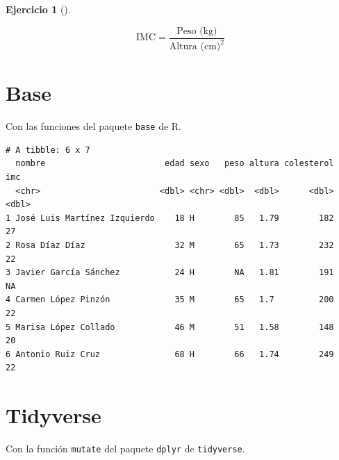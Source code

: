 \documentclass[
  a4paper,
]{scrreport}
\newenvironment{Shaded}{\begin{snugshade}}{\end{snugshade}}
\newcommand{\DecValTok}[1]{\textcolor[rgb]{0.68,0.00,0.00}{#1}}
\newcommand{\FunctionTok}[1]{\textcolor[rgb]{0.28,0.35,0.67}{#1}}
\newcommand{\NormalTok}[1]{\textcolor[rgb]{0.00,0.23,0.31}{#1}}
\newcommand{\OtherTok}[1]{\textcolor[rgb]{0.00,0.23,0.31}{#1}}
\newcommand{\SpecialCharTok}[1]{\textcolor[rgb]{0.37,0.37,0.37}{#1}}
\theoremstyle{definition}
\newtheorem{exercise}{Ejercicio}[chapter]
\theoremstyle{remark}
\begin{document}
\begin{exercise}[]
\begin{enumerate}
  \[
  \mbox{IMC} = \frac{\mbox{Peso (kg)}}{\mbox{Altura (cm)}^2}
  \]

  \begin{tcolorbox}[enhanced jigsaw, breakable, toptitle=1mm, colbacktitle=quarto-callout-tip-color!10!white, rightrule=.15mm, opacityback=0, opacitybacktitle=0.6, titlerule=0mm, coltitle=black, colframe=quarto-callout-tip-color-frame, colback=white, bottomtitle=1mm, leftrule=.75mm, toprule=.15mm, title=\textcolor{quarto-callout-tip-color}{\faLightbulb}\hspace{0.5em}{Solución}, arc=.35mm, bottomrule=.15mm, left=2mm]

  \section{Base}

  Con las funciones del paquete \texttt{base} de R.

\begin{Shaded}
\end{Shaded}

\begin{verbatim}
# A tibble: 6 x 7
  nombre                        edad sexo   peso altura colesterol   imc
  <chr>                        <dbl> <chr> <dbl>  <dbl>      <dbl> <dbl>
1 José Luis Martínez Izquierdo    18 H        85   1.79        182    27
2 Rosa Díaz Díaz                  32 M        65   1.73        232    22
3 Javier García Sánchez           24 H        NA   1.81        191    NA
4 Carmen López Pinzón             35 M        65   1.7         200    22
5 Marisa López Collado            46 M        51   1.58        148    20
6 Antonio Ruiz Cruz               68 H        66   1.74        249    22
\end{verbatim}

  \section{Tidyverse}

  Con la función \texttt{mutate} del paquete \texttt{dplyr} de
  \texttt{tidyverse}.


\end{tcolorbox}
\end{enumerate}
\end{exercise}
\end{document}
